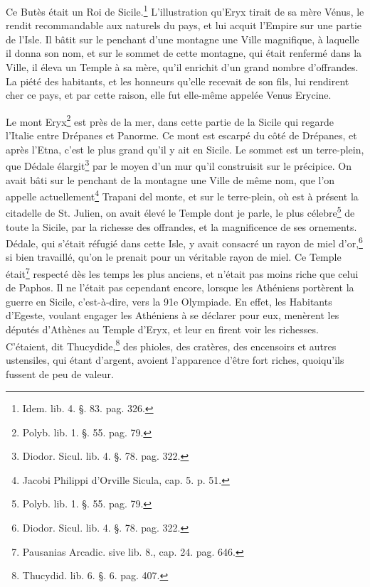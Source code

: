 \documentclass[a4paper, 18pt, oneside]{article}
\begin{document}
Ce Butès était un Roi de Sicile.\footnote{Idem. lib. 4. §. 83. pag. 326.} L'illustration qu'Eryx tirait de sa mère Vénus, le rendit recommandable aux naturels du pays, et lui acquit l'Empire sur une partie de l'Isle. Il bâtit sur le penchant d'une montagne une Ville magnifique, à laquelle il donna son nom, et sur le sommet de cette montagne, qui était renfermé dans la Ville, il éleva un Temple à sa mère, qu'il enrichit d'un grand nombre d'offrandes. La piété des habitants, et les honneurs qu'elle recevait de son fils, lui rendirent cher ce pays, et par cette raison, elle fut elle-même appelée Venus Erycine.

Le mont Eryx\footnote{Polyb. lib. 1. §. 55. pag. 79.} est près de la mer, dans cette partie de la Sicile qui regarde l'Italie entre Drépanes et Panorme. Ce mont est escarpé du côté de Drépanes, et après l'Etna, c'est le plus grand qu'il y ait en Sicile. Le sommet est un terre-plein, que Dédale élargit\footnote{Diodor. Sicul. lib. 4. §. 78. pag. 322.} par le moyen d'un mur qu'il construisit sur le précipice. On avait bâti sur le penchant de la montagne une Ville de même nom, que l'on appelle actuellement\footnote{Jacobi Philippi d'Orville Sicula, cap. 5. p. 51.} Trapani del monte, et sur le terre-plein, où est à présent la citadelle de St. Julien, on avait élevé le Temple dont je parle, le plus célebre\footnote{Polyb. lib. 1. §. 55. pag. 79.} de toute la Sicile, par la richesse des offrandes, et la magnificence de ses ornements. Dédale, qui s'était réfugié dans cette Isle, y avait consacré un rayon de miel d'or,\footnote{Diodor. Sicul. lib. 4. §. 78. pag. 322.} si bien travaillé, qu'on le prenait pour un véritable rayon de miel. Ce Temple était\footnote{Pausanias Arcadic. sive lib. 8., cap. 24. pag. 646.} respecté dès les temps les plus anciens, et n'était pas moins riche que celui de Paphos. Il ne l'était pas cependant encore, lorsque les Athéniens portèrent la guerre en Sicile, c'est-à-dire, vers la 91e Olympiade. En effet, les Habitants d'Egeste, voulant engager les Athéniens à se déclarer pour eux, menèrent les députés d'Athènes au Temple d'Eryx, et leur en firent voir les richesses. C'étaient, dit Thucydide,\footnote{Thucydid. lib. 6. §. 6. pag. 407.} des phioles, des cratères, des encensoirs et autres ustensiles, qui étant d'argent, avoient l'apparence d'être fort riches, quoiqu'ils fussent de peu de valeur.
\end{document}
